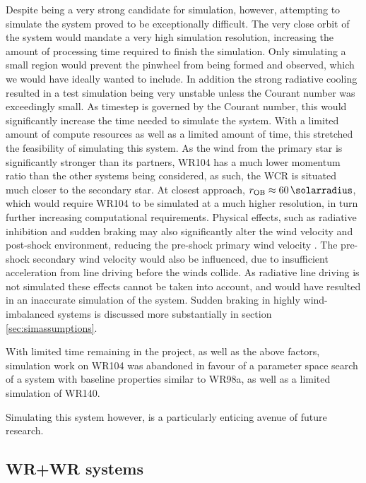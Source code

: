 Despite being a very strong candidate for simulation, however, attempting to simulate the system proved to be exceptionally difficult.
The very close orbit of the system would mandate a very high simulation resolution, increasing the amount of processing time required to finish the simulation.
Only simulating a small region would prevent the pinwheel from being formed and observed, which we would have ideally wanted to include.
In addition the strong radiative cooling resulted in a test simulation being very unstable unless the Courant number was exceedingly small.
As timestep is governed by the Courant number, this would significantly increase the time needed to simulate the system.
With a limited amount of compute resources as well as a limited amount of time, this stretched the feasibility of simulating this system.
As the wind from the primary star is significantly stronger than its partners, WR104 has a much lower momentum ratio than the other systems being considered, as such, the WCR is situated much closer to the secondary star.
At closest approach, $r_\text{OB} \approx \SI{60}{\solarradius}$, which would require WR104 to be simulated at a much higher resolution, in turn further increasing computational requirements.
Physical effects, such as radiative inhibition and sudden braking may also significantly alter the wind velocity and post-shock environment, reducing the pre-shock primary wind velocity \textcite{gayley_sudden_1997}.
The pre-shock secondary wind velocity would also be influenced, due to insufficient acceleration from line driving before the winds collide.
As radiative line driving is not simulated these effects cannot be taken into account, and would have resulted in an inaccurate simulation of the system.
Sudden braking in highly wind-imbalanced systems is discussed more substantially in section \ref{sec:simassumptions}.

With limited time remaining in the project, as well as the above factors, simulation work on WR104 was abandoned in favour of a parameter space search of a system with baseline properties similar to WR98a, as well as a limited simulation of WR140.

Simulating this system however, is a particularly enticing avenue of future research.

\subsection{WR+WR systems}


